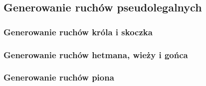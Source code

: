 \subsection{Generowanie ruchów pseudolegalnych}
\label{subsec:generowanie-ruchow-pseudolegalnych}

\subsubsection{Generowanie ruchów króla i skoczka}
\subsubsection{Generowanie ruchów hetmana, wieży i gońca}
\subsubsection{Generowanie ruchów piona}